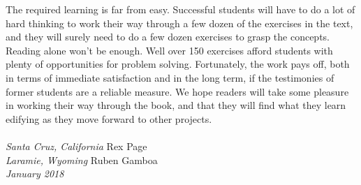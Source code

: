 The required learning is far from easy.
Successful students will have to do a lot of hard thinking
to work their way through a few dozen of the exercises in the text,
and they will surely need to do a few dozen exercises to grasp the concepts.
Reading alone won't be enough. 
Well over 150 exercises afford students with plenty of opportunities
for problem solving.
Fortunately, the work pays off, both in terms of immediate satisfaction
and in the long term, if the testimonies of former students are a
reliable measure.
We hope readers will take some pleasure in working their way through
the book, and that they will find what they learn
edifying as they move forward to other projects.
\\
\\
\emph{Santa Cruz, California}   \hfill Rex Page \\
\emph{Laramie, Wyoming}         \hfill Ruben Gamboa \\
\emph{January 2018}


